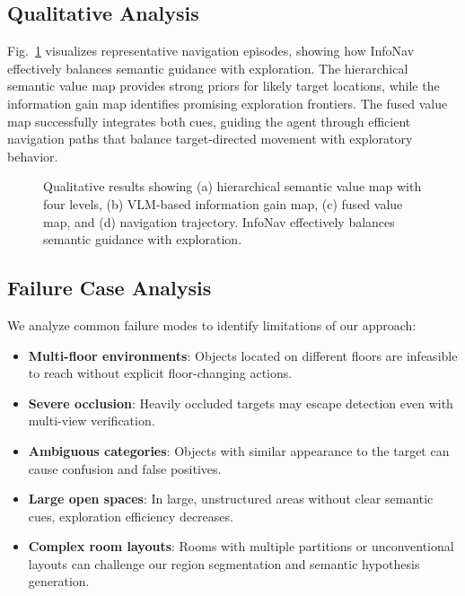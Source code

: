 \documentclass[conference]{IEEEtran}
\begin{document}
\subsection{Qualitative Analysis}

Fig.~\ref{fig:qualitative} visualizes representative navigation episodes, showing how InfoNav effectively balances semantic guidance with exploration. The hierarchical semantic value map provides strong priors for likely target locations, while the information gain map identifies promising exploration frontiers. The fused value map successfully integrates both cues, guiding the agent through efficient navigation paths that balance target-directed movement with exploratory behavior.

\begin{figure}[t]
    \centering
    \caption{Qualitative results showing (a) hierarchical semantic value map with four levels, (b) VLM-based information gain map, (c) fused value map, and (d) navigation trajectory. InfoNav effectively balances semantic guidance with exploration.}
    \label{fig:qualitative}
\end{figure}

\subsection{Failure Case Analysis}

We analyze common failure modes to identify limitations of our approach:
\begin{itemize}
    \item \textbf{Multi-floor environments}: Objects located on different floors are infeasible to reach without explicit floor-changing actions.
    \item \textbf{Severe occlusion}: Heavily occluded targets may escape detection even with multi-view verification.
    \item \textbf{Ambiguous categories}: Objects with similar appearance to the target can cause confusion and false positives.
    \item \textbf{Large open spaces}: In large, unstructured areas without clear semantic cues, exploration efficiency decreases.
    \item \textbf{Complex room layouts}: Rooms with multiple partitions or unconventional layouts can challenge our region segmentation and semantic hypothesis generation.
\end{itemize}
\end{document}
